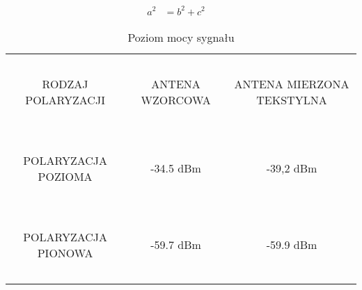 \begin{align}
a^2&=b^2+c^2
\quad
\end{align}
 
\begin{table}[h!]
\begin{center}
    \begin{tabular}{|c|c|c|}
    \hline
    ~                     & ~               & ~                         \\
     RODZAJ POLARYZACJI    & ANTENA WZORCOWA & ANTENA MIERZONA TEKSTYLNA \\
    ~                     & ~               & ~                         \\ \hline
    ~                     & ~               & ~                         \\
     POLARYZACJA POZIOMA  & -34.5 dBm       & -39,2 dBm                 \\
    ~                     & ~               & ~                         \\ \hline
    ~                     & ~               & ~                         \\
     POLARYZACJA PIONOWA  & -59.7 dBm       & -59.9 dBm                 \\
    ~                     & ~               & ~                         \\ \hline
    \end{tabular}
    \caption{Poziom mocy sygnału}
\end{center}
\end{table}


